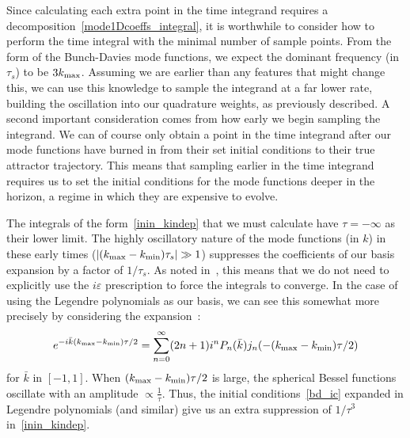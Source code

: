 Since calculating each extra point in the time integrand requires a
decomposition~\eqref{mode1Dcoeffs_integral}, it is worthwhile to consider how to perform the
time integral with the minimal number of sample points. From the form of the Bunch-Davies mode functions,
we expect the dominant frequency (in $\tau_s$) to be $3{k_\text{max}}$.
Assuming we are earlier than any features that might change this,
we can use this knowledge to sample the integrand at a far lower rate,
building the oscillation into our quadrature weights, as previously described.
A second important consideration comes from how early we
begin sampling the integrand.
We can of course only obtain a point in the time integrand after our mode
functions have burned in from their set initial conditions to their true
attractor trajectory. This means that sampling earlier in the time integrand
requires us to set the initial conditions for the mode functions deeper
in the horizon, a regime in which they are expensive to evolve.


The integrals of the form~\eqref{inin_kindep} that we must calculate have $\tau=-\infty$ as their lower limit.
The highly oscillatory nature of the mode functions (in $k$) in these early times ($\lvert ({k_\text{max}}-{k_\text{min}})\tau_s\rvert\gg1$) suppresses the
coefficients of our basis expansion by a factor of $1/\tau_s$.
As noted in~\cite{Funakoshi}, this means that we do not need to
explicitly use the $i\varepsilon$ prescription to force the integrals to converge.
In the case of using the Legendre polynomials as our
basis, we can see this somewhat more precisely by considering
the expansion~\cite{finite_ft_legendre}:
\begin{align}\label{exp_expansion}
    e^{-i\bar{k}({k_\text{max}}-{k_\text{min}})\tau/2} = \sum_{n=0}^{\infty}(2n+1)i^n P_n(\bar{k})j_n(-({k_\text{max}}-{k_\text{min}})\tau/2)
\end{align}
for $\bar{k}$ in $[-1,1]$. When $({k_\text{max}}-{k_\text{min}})\tau/2$ is large, the spherical Bessel functions
oscillate with an amplitude $\propto\frac{1}{\tau}$. Thus,
the initial conditions~\eqref{bd_ic} expanded in Legendre polynomials (and similar)
give us an extra suppression of $1/\tau^3$ in~\eqref{inin_kindep}.


